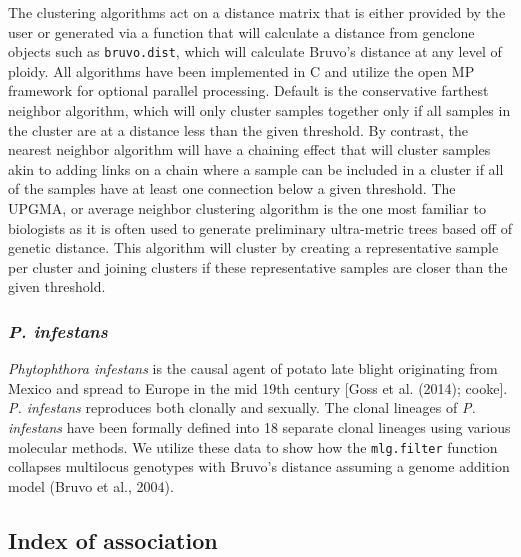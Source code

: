 \documentclass{frontiersSCNS} %
\begin{document}
The clustering algorithms act on a distance matrix that is either
provided by the user or generated via a function that will calculate a
distance from genclone objects such as \texttt{bruvo.dist}, which will
calculate Bruvo's distance at any level of ploidy. All algorithms have
been implemented in C and utilize the open MP framework for optional
parallel processing. Default is the conservative farthest neighbor
algorithm, which will only cluster samples together only if all samples
in the cluster are at a distance less than the given threshold. By
contrast, the nearest neighbor algorithm will have a chaining effect
that will cluster samples akin to adding links on a chain where a sample
can be included in a cluster if all of the samples have at least one
connection below a given threshold. The UPGMA, or average neighbor
clustering algorithm is the one most familiar to biologists as it is
often used to generate preliminary ultra-metric trees based off of
genetic distance. This algorithm will cluster by creating a
representative sample per cluster and joining clusters if these
representative samples are closer than the given threshold.

\subsubsection*{\texorpdfstring{\emph{P.
infestans}}{P. infestans}}\label{p.-infestans}

\emph{Phytophthora infestans} is the causal agent of potato late blight
originating from Mexico and spread to Europe in the mid 19th century
{[}Goss et al. (2014); cooke{]}. \emph{P. infestans} reproduces both
clonally and sexually. The clonal lineages of \emph{P. infestans} have
been formally defined into 18 separate clonal lineages using various
molecular methods. We utilize these data to show how the
\texttt{mlg.filter} function collapses multilocus genotypes with Bruvo's
distance assuming a genome addition model (Bruvo et al., 2004).

\subsection*{Index of association}\label{index-of-association}
\end{document}
